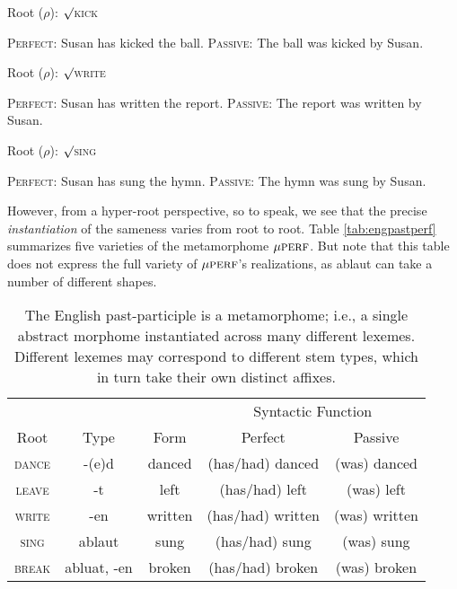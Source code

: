 \begin{exe}
\label{ex:pastpart}
	\ex Root ($\rho$): $\surd$\textsc{kick}
		\begin{xlist} \label{ex:pastpart:kick}
		\ex \textsc{Perfect:} Susan has kicked the ball. \label{ex:pastpart:kick:perf}
		\ex \textsc{Passive:} The ball was kicked by Susan.\label{ex:pastpart:kick:pass}
		\end{xlist}
	\ex Root ($\rho$): $\surd$\textsc{write}
		\begin{xlist} \label{ex:pastpart:write}
		\ex \textsc{Perfect:} Susan has written the report. \label{ex:pastpart:write:perf}
		\ex \textsc{Passive:} The report was written by Susan. \label{ex:pastpart:write:pass}
		\end{xlist}
	\ex Root ($\rho$): $\surd$\textsc{sing}
		\begin{xlist} \label{ex:pastpart:sing}
		\ex \textsc{Perfect:} Susan has sung the hymn. \label{ex:pastpart:sing:perf}
		\ex \textsc{Passive:} The hymn was sung by Susan. \label{ex:pastpart:sing:pass}
		\end{xlist}
\end{exe}
However,
from a hyper-root perspective, so to speak, we see that the precise \emph{instantiation} of the sameness varies from root to root.  
Table \ref{tab:engpastperf} summarizes five varieties of the metamorphome $\mu{\textsc{perf}}$. But note that this table
does not express the full variety of $\mu{\textsc{perf}}$'s realizations, as ablaut can take a number of different shapes.
\begin{table}[ht]
\centering
\setlength{\extrarowheight}{8pt}
\begin{tabular}{c c c c c}
\toprule
& & & \multicolumn{2}{c}{Syntactic Function} \\[-1ex] 
Root & Type & Form & Perfect & Passive  \\ [0.5ex]
\midrule
\textsc{dance} & -(e)d & danced & (has/had) danced & (was) danced \\
\textsc{leave} & -t & left & (has/had) left & (was) left \\ 
\textsc{write} & -en & written & (has/had) written & (was) written \\
\textsc{sing} & ablaut & sung & (has/had) sung & (was) sung \\
\textsc{break} & abluat, -en & broken & (has/had) broken & (was) broken \\
\bottomrule
\end{tabular}
\label{tab:engpastpart}
\caption{The English past-participle is a metamorphome; i.e., a single abstract morphome instantiated across many different lexemes. Different lexemes may correspond to different stem types, which in turn take their own distinct affixes.}
\end{table}

